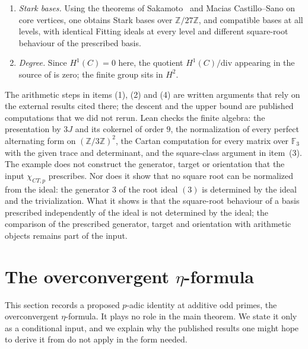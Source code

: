 \documentclass[11pt]{article}
\theoremstyle{definition}
\newcommand{\Z}{\mathbb{Z}}
\newcommand{\chiCTp}{\chi_{CT,p}}                       \newcommand{\AofE}{\mathcal{A}_E}                        \newcommand{\etap}{\eta_p}                              \newcommand{\RefStable}{\mathbf{RefStable\,AOR}}
\begin{document}
\begin{example}[An ordinary Selmer complex at $p=3$]
\begin{enumerate}
  $2$ modulo $3$, which is impossible.  So every invariant that factors
  through the ideal, including its valuation, takes the same value on the
  two generators, while only one of them lies in the image of the fixed
  squaring map.
\item \emph{Stark bases.}  Using the theorems of
  Sakamoto~\citep{Sakamoto2018} and Macias Castillo--Sano on core
  vertices, one obtains Stark bases over $\Z/27\Z$, and compatible bases
  at all levels, with identical Fitting ideals at every level and
  different square-root behaviour of the prescribed basis.
\item \emph{Degree.}  Since $H^1(C)=0$ here, the quotient
  $H^1(C)/\mathrm{div}$ appearing in the source of
   is zero; the finite group sits in
  $H^2$.
\end{enumerate}
\end{example}

The arithmetic steps in items (1), (2) and (4) are written arguments that
rely on the external results cited there; the descent and the upper bound
are published computations that we did not rerun.  Lean checks the
finite algebra: the presentation by $3J$ and its cokernel of order $9$,
the normalization of every perfect alternating form on $(\Z/3\Z)^2$, the
Cartan computation for every matrix over $\mathbb F_3$ with the given
trace and determinant, and the square-class argument in item~(3).  The
example does not construct the generator, target or orientation that the
input $\chiCTp$ prescribes.  Nor does it show that no square root can be
normalized from the ideal: the generator $3$ of the root ideal $(3)$ is
determined by the ideal and the trivialization.  What it shows is that
the square-root behaviour of a basis prescribed independently of the ideal
is not determined by the ideal; the comparison of the prescribed
generator, target and orientation with arithmetic objects remains part of
the input.
 \section{The overconvergent \texorpdfstring{$\eta$}{eta}-formula}
\label{sec:eta-formula}

This section records a proposed $p$-adic identity at additive odd primes,
the overconvergent $\eta$-formula.  It plays no role in the main theorem.
We state it only as a conditional input, and we explain why the published
results one might hope to derive it from do not apply in the form needed.
\end{document}
